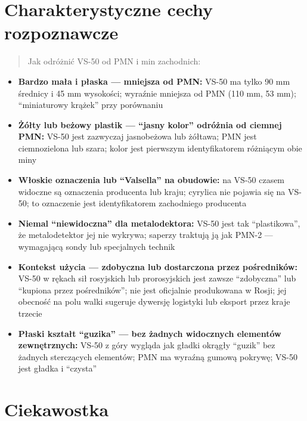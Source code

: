 \documentclass[12pt,openany,oneside]{book}
\providecommand{\tightlist}{%
  \setlength{\itemsep}{0pt}\setlength{\parskip}{0pt}}
\begin{document}
\section{Charakterystyczne cechy
rozpoznawcze}\label{charakterystyczne-cechy-rozpoznawcze-119}

\begin{quote}
Jak odróżnić VS-50 od PMN i min zachodnich:
\end{quote}

\begin{itemize}
\tightlist
\item
  \textbf{Bardzo mała i płaska --- mniejsza od PMN:} VS-50 ma tylko 90
  mm średnicy i 45 mm wysokości; wyraźnie mniejsza od PMN (110 mm, 53
  mm); ``miniaturowy krążek'' przy porównaniu
\item
  \textbf{Żółty lub beżowy plastik --- ``jasny kolor'' odróżnia od
  ciemnej PMN:} VS-50 jest zazwyczaj jasnobeżowa lub żółtawa; PMN jest
  ciemnozielona lub szara; kolor jest pierwszym identyfikatorem
  różniącym obie miny
\item
  \textbf{Włoskie oznaczenia lub ``Valsella'' na obudowie:} na VS-50
  czasem widoczne są oznaczenia producenta lub kraju; cyrylica nie
  pojawia się na VS-50; to oznaczenie jest identyfikatorem zachodniego
  producenta
\item
  \textbf{Niemal ``niewidoczna'' dla metalodektora:} VS-50 jest tak
  ``plastikowa'', że metalodetektor jej nie wykrywa; saperzy traktują ją
  jak PMN-2 --- wymagającą sondy lub specjalnych technik
\item
  \textbf{Kontekst użycia --- zdobyczna lub dostarczona przez
  pośredników:} VS-50 w rękach sił rosyjskich lub prorosyjskich jest
  zawsze ``zdobyczna'' lub ``kupiona przez pośredników''; nie jest
  oficjalnie produkowana w Rosji; jej obecność na polu walki sugeruje
  dywersję logistyki lub eksport przez kraje trzecie
\item
  \textbf{Płaski kształt ``guzika'' --- bez żadnych widocznych elementów
  zewnętrznych:} VS-50 z góry wygląda jak gładki okrągły ``guzik'' bez
  żadnych sterczących elementów; PMN ma wyraźną gumową pokrywę; VS-50
  jest gładka i ``czysta''
\end{itemize}

\section{Ciekawostka}\label{ciekawostka-119}
\end{document}
